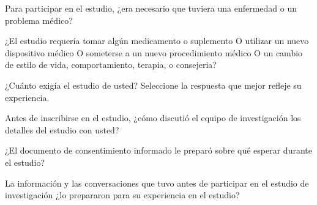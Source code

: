 \documentclass[spanish,pagemark,stamp,oneside,print_questionnaire_id]{sdapsclassic}
\begin{document}
\begin{questionnaire}
\begin{Form}
                        \begin{optionquestion}[singlechoice,cols=1]{Para participar en el estudio, ¿era necesario que tuviera una enfermedad o un problema médico?}\end{optionquestion}
                        \begin{optionquestion}[singlechoice,cols=1]{¿El estudio requería tomar algún medicamento o suplemento O utilizar un nuevo dispositivo médico O someterse a un nuevo procedimiento médico O un cambio de estilo de vida, comportamiento, terapia, o consejeria?}\end{optionquestion}
                        \begin{optionquestion}[singlechoice,cols=1]{¿Cuánto exigía el estudio de usted? Seleccione la respuesta que mejor refleje su experiencia.}\end{optionquestion}
                        \begin{optionquestion}[singlechoice,cols=1]{Antes de inscribirse en el estudio, ¿cómo discutió el equipo de investigación los detalles del estudio con usted?}\end{optionquestion}
                        \begin{optionquestion}[singlechoice,cols=1]{¿El documento de consentimiento informado le preparó sobre qué esperar durante el estudio?}\end{optionquestion}
                        \begin{optionquestion}[singlechoice,cols=1]{La información y las conversaciones que tuvo antes de participar en el estudio de investigación ¿lo prepararon para su experiencia en el estudio?}\end{optionquestion}

\end{Form}
\end{questionnaire}
\end{document}
